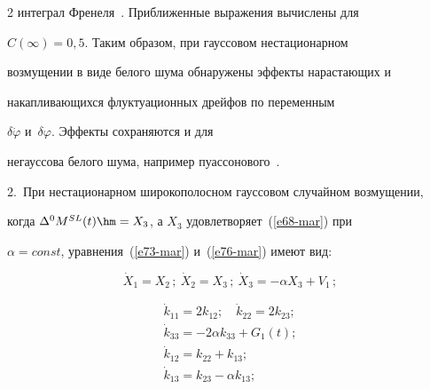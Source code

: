 \begin{multicols}{2}
интеграл Френеля~\cite{18-mar}. Приближенные выражения вычислены для


$C(\infty)  =0{,}5$. Таким образом, при гауссовом нестационарном


возмущении в виде белого шума обнаружены эффекты нарастающих и


накапливающихся флуктуационных дрейфов по переменным


$\delta\dot\varphi$ и~$\delta\varphi$. Эффекты сохраняются и для


негауссова белого шума, например пуассонового~\cite{15-mar, 16-mar}.





\medskip





2.\ При нестационарном широкополосном гауссовом случайном возмущении,


когда  $\Delta^0 M^{SL} (t) \hm= X_3$, а $X_3$ удовлетворяет~(\ref{e68-mar}) при


$\alpha =const$, уравнения~(\ref{e73-mar}) и~(\ref{e76-mar}) имеют вид:


\begin{equation*}


\dot X_1 = X_2\,; \  \dot X_2 = X_3\,; \ \dot X_3 = -\alpha X_3+V_1\,; %


\end{equation*}





\vspace*{-6pt}





\noindent


\begin{equation}


\left.


\begin{array}{c}


\dot k_{11} = 2 k_{12};\quad \dot k_{22} = 2 k_{23};\\[6pt] 


    \dot k_{33} = -2\alpha k_{33} +G_1 (t);\\[6pt]


    \dot k_{12} = k_{22}+ k_{13};\\[6pt]


    \dot k_{13} = k_{23}-\alpha k_{13};\\ [6pt]



\end{array}
\end{equation}
\end{multicols}
